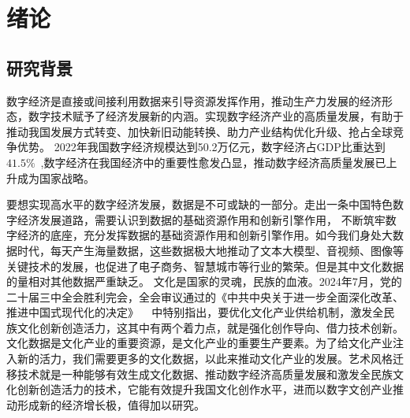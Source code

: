 \chapter{绪论}

\section{研究背景}
\indent
数字经济是直接或间接利用数据来引导资源发挥作用，推动生产力发展的经济形态，数字技术赋予了经济发展新的内涵。实现数字经济产业的高质量发展，有助于推动我国发展方式转变、加快新旧动能转换、助力产业结构优化升级、抢占全球竞争优势。
2022年我国数字经济规模达到50.2万亿元，数字经济占GDP比重达到$41.5\%$~\cite{shuzijingjiReport},数字经济在我国经济中的重要性愈发凸显，推动数字经济高质量发展已上升成为国家战略。
\par 要想实现高水平的数字经济发展，数据是不可或缺的一部分。走出一条中国特色数字经济发展道路，需要认识到数据的基础资源作用和创新引擎作用，
不断筑牢数字经济的底座，充分发挥数据的基础资源作用和创新引擎作用。如今我们身处大数据时代，每天产生海量数据，这些数据极大地推动了文本大模型、音视频、图像等关键技术的发展，也促进了电子商务、智慧城市等行业的繁荣。但是其中文化数据的量相对其他数据严重缺乏。
文化是国家的灵魂，民族的血液。2024年7月，党的二十届三中全会胜利完会，全会审议通过的《中共中央关于进一步全面深化改革、推进中国式现代化的决定》 ~\cite{xjptheory1} 中特别指出，要优化文化产业供给机制，激发全民族文化创新创造活力，这其中有两个着力点，就是强化创作导向、借力技术创新。
文化数据是文化产业的重要资源，是文化产业的重要生产要素。为了给文化产业注入新的活力，我们需要更多的文化数据，以此来推动文化产业的发展。艺术风格迁移技术就是一种能够有效生成文化数据、推动数字经济高质量发展和激发全民族文化创新创造活力的技术，它能有效提升我国文化创作水平，进而以数字文创产业推动形成新的经济增长极，值得加以研究。

